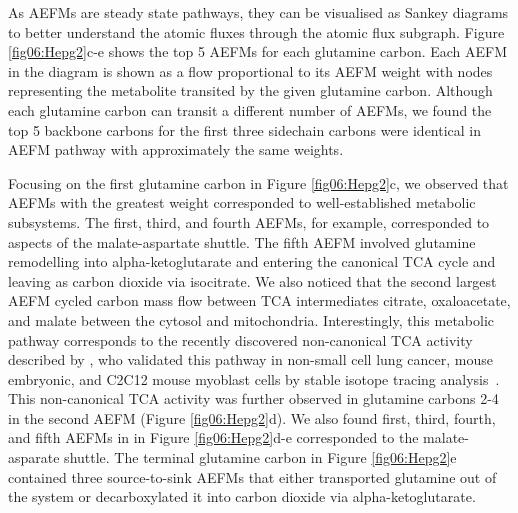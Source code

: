 \documentclass[12pt]{article}
\begin{document}
As AEFMs are steady state pathways, they can be visualised as Sankey
diagrams to better understand the atomic fluxes through the atomic flux
subgraph. Figure \ref{fig06:Hepg2}c-e shows the top 5 AEFMs for each
glutamine carbon. Each AEFM in the diagram is shown as a flow proportional
to its AEFM weight with nodes representing the metabolite transited by the
given glutamine carbon. Although each glutamine carbon can transit
a different number of AEFMs, we found the top 5 backbone carbons for the
first three sidechain carbons were identical in AEFM pathway with
approximately the same weights.

Focusing on the first glutamine carbon in Figure \ref{fig06:Hepg2}c, we
observed that AEFMs with the greatest weight corresponded to
well-established metabolic subsystems. The first, third, and fourth AEFMs,
for example, corresponded to aspects of the malate-aspartate shuttle. The
fifth AEFM involved glutamine remodelling into alpha-ketoglutarate and
entering the canonical TCA cycle and leaving as carbon dioxide via
isocitrate. We also noticed that the second largest AEFM cycled carbon
mass flow between TCA intermediates citrate, oxaloacetate, and malate
between the cytosol and mitochondria. Interestingly, this metabolic
pathway corresponds to the recently discovered non-canonical TCA activity
described by \citeauthor{ArnoldPaigeK2022Anta}, who validated this pathway
in non-small cell lung cancer, mouse embryonic, and C2C12 mouse myoblast
cells by stable isotope tracing analysis~\citep{ArnoldPaigeK2022Anta}.
This non-canonical TCA activity was further observed in glutamine carbons
2-4 in the second AEFM (Figure \ref{fig06:Hepg2}d). We also found first,
third, fourth, and fifth AEFMs in in Figure \ref{fig06:Hepg2}d-e
corresponded to the malate-asparate shuttle. The terminal glutamine carbon
in Figure \ref{fig06:Hepg2}e contained three source-to-sink AEFMs that
either transported glutamine out of the system or decarboxylated it into
carbon dioxide via alpha-ketoglutarate.
\end{document}
